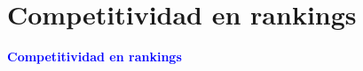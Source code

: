 \documentclass[10pt,hyperref={unicode}]{beamer}
\begin{document}
			
		
	
	
	\section{Competitividad en rankings}
	
	\begin{frame}
		\begin{center}
			\Huge\textbf{\textsf{\textcolor{blue}{Competitividad en rankings}}}
		\end{center}
	\end{frame}
	
\end{document}
